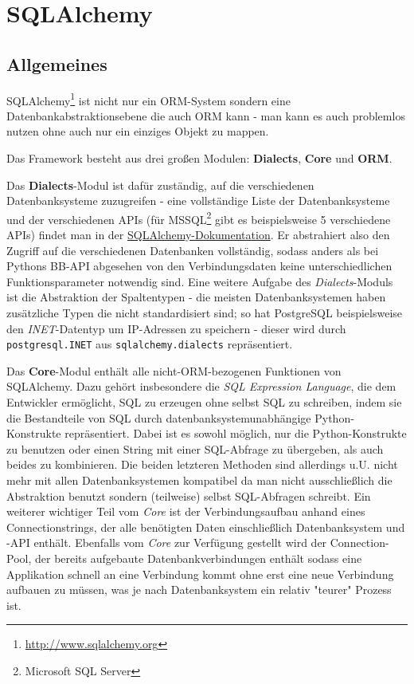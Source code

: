 \chapter{SQLAlchemy}

\section{Allgemeines}

SQLAlchemy\footnote{\href{http://www.sqlalchemy.org}{http://www.sqlalchemy.org}}
ist nicht nur ein ORM-System sondern eine Datenbankabstraktionsebene die auch
ORM kann - man kann es auch problemlos nutzen ohne auch nur ein einziges Objekt
zu mappen.

Das Framework besteht aus drei großen Modulen: \textbf{Dialects}, \textbf{Core}
und \textbf{ORM}.

Das \textbf{Dialects}-Modul ist dafür zuständig, auf die verschiedenen
Datenbanksysteme zuzugreifen - eine vollständige Liste der Datenbanksysteme und
der verschiedenen APIs (für MSSQL\footnote{Microsoft SQL Server} gibt es
beispielsweise 5 verschiedene APIs) findet man in der
\href{http://www.sqlalchemy.org/docs/core/engines.html#supported-dbapis}
{SQLAlchemy-Dokumentation}. Er abstrahiert also den Zugriff auf die
verschiedenen Datenbanken vollständig, sodass anders als bei Pythons BB-API
abgesehen von den Verbindungsdaten keine unterschiedlichen Funktionsparameter
notwendig sind. Eine weitere Aufgabe des \emph{Dialects}-Moduls ist die
Abstraktion der Spaltentypen - die meisten Datenbanksystemen haben zusätzliche
Typen die nicht standardisiert sind; so hat PostgreSQL beispielsweise den
\emph{INET}-Datentyp um IP-Adressen zu speichern - dieser wird durch
\texttt{postgresql.INET} aus \texttt{sqlalchemy.dialects} repräsentiert.

Das \textbf{Core}-Modul enthält alle nicht-ORM-bezogenen Funktionen von
SQLAlchemy. Dazu gehört insbesondere die \emph{SQL Expression Language}, die dem
Entwickler ermöglicht, SQL zu erzeugen ohne selbst SQL zu schreiben, indem sie
die Bestandteile von SQL durch datenbanksystemunabhängige Python-Konstrukte
repräsentiert. Dabei ist es sowohl möglich, nur die Python-Konstrukte zu
benutzen oder einen String mit einer SQL-Abfrage zu übergeben, als auch beides
zu kombinieren. Die beiden letzteren Methoden sind allerdings u.U. nicht mehr
mit allen Datenbanksystemen kompatibel da man nicht ausschließlich die
Abstraktion benutzt sondern (teilweise) selbst SQL-Abfragen schreibt. Ein
weiterer wichtiger Teil vom \emph{Core} ist der Verbindungsaufbau anhand eines
Connectionstrings, der alle benötigten Daten einschließlich Datenbanksystem und
-API enthält. Ebenfalls vom \emph{Core} zur Verfügung gestellt wird der
Connection-Pool, der bereits aufgebaute Datenbankverbindungen enthält sodass
eine Applikation schnell an eine Verbindung kommt ohne erst eine neue Verbindung
aufbauen zu müssen, was je nach Datenbanksystem ein relativ "teurer" Prozess
ist.


